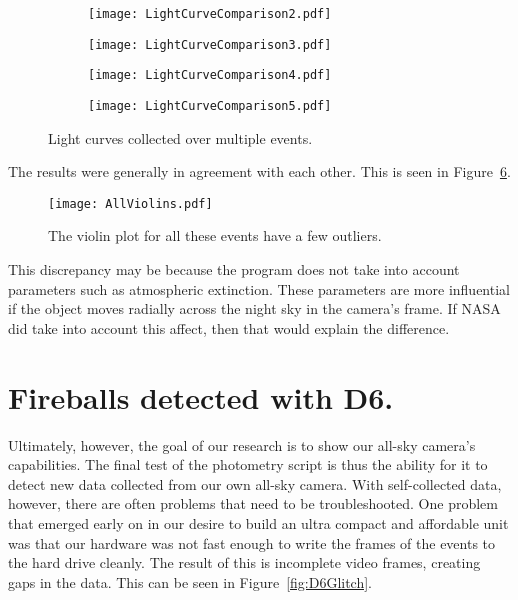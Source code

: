 \begin{figure}
\centering
\begin{subfigure}{.45\textwidth}
  \centering
  \texttt{[image: LightCurveComparison2.pdf]}
  \label{fig:nothresholdd6}
\end{subfigure}%
\begin{subfigure}{.45\textwidth}
  \centering
  \texttt{[image: LightCurveComparison3.pdf]}
  \label{fig:thresholdd6}
\end{subfigure}
\begin{subfigure}{.45\textwidth}
  \centering
  \texttt{[image: LightCurveComparison4.pdf]}
  \label{fig:thresholdd6}
\end{subfigure}
\begin{subfigure}{.45\textwidth}
  \centering
  \texttt{[image: LightCurveComparison5.pdf]}
  \label{fig:thresholdd6}
\end{subfigure}
\caption{Light curves collected over multiple events.}
\label{fig:lightcurves}
\end{figure}


The results were generally in agreement with each other. This is seen in Figure~\ref{fig:AllViolins}.

\begin{figure}[ht!]
	\centering
	\texttt{[image: AllViolins.pdf]}
	\caption{The violin plot for all these events have a few outliers.}
	\label{fig:AllViolins}
\end{figure}

This discrepancy may be because the program does not take into account parameters such as atmospheric extinction. These parameters are more influential if the object moves radially across the night sky in the camera's frame. If NASA did take into account this affect, then that would explain the difference. 

\section{Fireballs detected with D6.}

Ultimately, however, the goal of our research is to show our all-sky camera's capabilities. The final test of the photometry script is thus the ability for it to detect new data collected from our own all-sky camera. With self-collected data, however, there are often problems that need to be troubleshooted. One problem that emerged early on in our desire to build an ultra compact and affordable unit was that our hardware was not fast enough to write the frames of the events to the hard drive cleanly. The result of this is incomplete video frames, creating gaps in the data. This can be seen in Figure~\ref{fig:D6Glitch}. 

